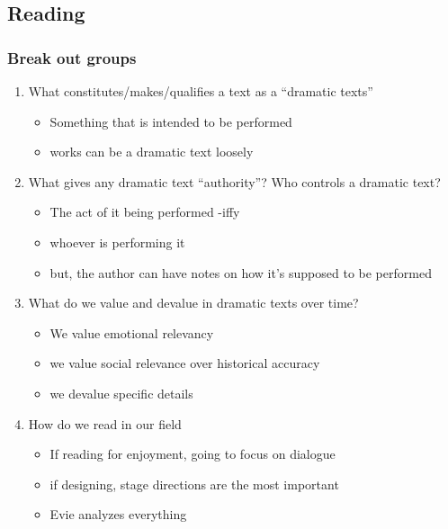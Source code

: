 \documentclass[12pt]{article}
\begin{document}
        \subsection{Reading}
            \subsubsection{Break out groups}
                \begin{enumerate}
                    \item What constitutes/makes/qualifies a text as a ``dramatic texts''
                    \begin{itemize}
                        \item Something that is intended to be performed
                        \item works can be a dramatic text loosely
                    \end{itemize}
                    \item What gives any dramatic text ``authority''? Who controls a dramatic text?
                    \begin{itemize}
                        \item The act of it being performed -iffy
                        \item whoever is performing it
                        \item but, the author can have notes on how it's supposed to be performed
                    \end{itemize}
                    \item What do we value and devalue in dramatic texts over time?
                    \begin{itemize}
                        \item We value emotional relevancy
                        \item we value social relevance over historical accuracy
                        \item we devalue specific details
                    \end{itemize}
                    \item How do we read in our field
                    \begin{itemize}
                        \item If reading for enjoyment, going to focus on dialogue
                        \item if designing, stage directions are the most important
                        \item Evie analyzes everything
                    \end{itemize}
                \end{enumerate}
                \newpage
\end{document}
